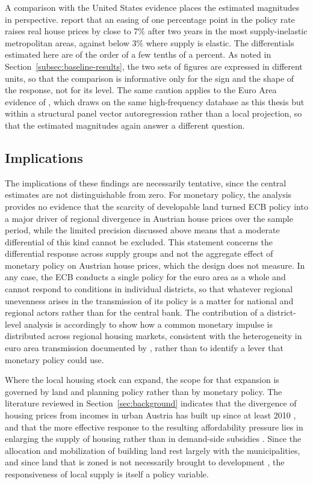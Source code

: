 \documentclass[a4paper,12pt, headsepline]{scrartcl}
\numberwithin{equation}{section}
\begin{document}
A comparison with the United States evidence places the estimated magnitudes in perspective. \citet{aastveit2022} report that an easing of one percentage point in the policy rate raises real house prices by close to 7\% after two years in the most supply-inelastic metropolitan areas, against below 3\% where supply is elastic. The differentials estimated here are of the order of a few tenths of a percent. As noted in Section~\ref{subsec:baseline-results}, the two sets of figures are expressed in different units, so that the comparison is informative only for the sign and the shape of the response, not for its level. The same caution applies to the Euro Area evidence of \citet{battistini2025}, which draws on the same high-frequency database as this thesis but within a structural panel vector autoregression rather than a local projection, so that the estimated magnitudes again answer a different question.

\subsection{Implications}\label{subsec:policy}

The implications of these findings are necessarily tentative, since the central estimates are not distinguishable from zero. For monetary policy, the analysis provides no evidence that the scarcity of developable land turned ECB policy into a major driver of regional divergence in Austrian house prices over the sample period, while the limited precision discussed above means that a moderate differential of this kind cannot be excluded. This statement concerns the differential response across supply groups and not the aggregate effect of monetary policy on Austrian house prices, which the design does not measure. In any case, the ECB conducts a single policy for the euro area as a whole and cannot respond to conditions in individual districts, so that whatever regional unevenness arises in the transmission of its policy is a matter for national and regional actors rather than for the central bank. The contribution of a district-level analysis is accordingly to show how a common monetary impulse is distributed across regional housing markets, consistent with the heterogeneity in euro area transmission documented by \citet{battistini2025}, rather than to identify a lever that monetary policy could use.

Where the local housing stock can expand, the scope for that expansion is governed by land and planning policy rather than by monetary policy. The literature reviewed in Section~\ref{sec:background} indicates that the divergence of housing prices from incomes in urban Austria has built up since at least 2010 \citep{mundt2024}, and that the more effective response to the resulting affordability pressure lies in enlarging the supply of housing rather than in demand-side subsidies \citep{mundt2024}. Since the allocation and mobilization of building land rest largely with the municipalities, and since land that is zoned is not necessarily brought to development \citep{schindelegger2025}, the responsiveness of local supply is itself a policy variable.
\end{document}
